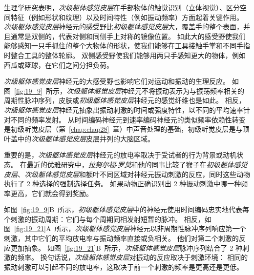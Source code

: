 生理学研究表明，\textit{次级躯体感觉皮层}在手部物体的触觉识别（立体视觉）、区分空间特征（例如形状和纹理）以及时间特性（例如振动频率）方面起着关键作用。
\textit{次级躯体感觉皮层}神经元的感受野比\textit{初级躯体感觉皮层}大，覆盖手的整个表面，并且通常是双侧的，代表对侧和同侧手上对称的镜像位置。
如此大的感受野使我们能够感知一只手抓住的整个大物体的形状，使我们能够在工具接触手掌和不同手指时整合工具的整体轮廓。
双侧感受野使我们能够用两只手感知更大的物体，例如西瓜或篮球，在它们之间分担负荷。


\textit{次级躯体感觉皮层}神经元的大感受野也影响它们对运动和振动的生理反应。
如图~\ref{fig:19_9}~所示，\textit{次级躯体感觉皮层}神经元不将振动表示为与振荡频率相关的周期性脉冲序列，皮肤或\textit{初级躯体感觉皮层}神经元的感觉纤维也是如此。
相反，\textit{次级躯体感觉皮层}神经元抽象出振动刺激的时间或强度特性，以不同的平均速率针对不同的频率发射。
从时间编码神经元到速率编码神经元的类似频率依赖性转变是初级听觉皮层（第~\ref{chap:chap28}~章）中声音处理的基础，初级听觉皮层是与顶叶盖中的\textit{次级躯体感觉皮层}皮层并列的大脑区域。


重要的是，\textit{次级躯体感觉皮层}神经元的放电率取决于受试者的行为背景或动机状态。
在最近的优雅研究中，\textit{拉努尔福$\cdot$罗莫}和他的同事比较了猴子在\textit{初级躯体感觉皮层}、\textit{次级躯体感觉皮层}和额叶不同区域对神经元振动刺激的反应，同时这些动物执行了 2 种选择的强制选择任务。
如果动物正确识别出 2 种振动刺激中哪一种频率更高，它们就会得到奖励。


如图~\ref{fig:19_9}B~所示，\textit{初级躯体感觉皮层}中的神经元使用时间编码忠实地代表每个刺激的振动周期：它们与每个周期同相发射短暂的脉冲。
相反，如图~\ref{fig:19_21}A~所示，\textit{次级躯体感觉皮层}神经元以非周期性脉冲序列响应第一个刺激，其中它们的平均放电率与振动频率直接或负相关。
他们对第二个刺激的反应更加抽象。
如图~\ref{fig:19_21}B~所示，\textit{次级躯体感觉皮层}脉冲序列结合了 2 种刺激的频率。
换句话说，\textit{次级躯体感觉皮层}对振动的反应取决于刺激环境：
相同的振动刺激可以引起不同的放电率，这取决于前一个刺激的频率是更高还是更低。


